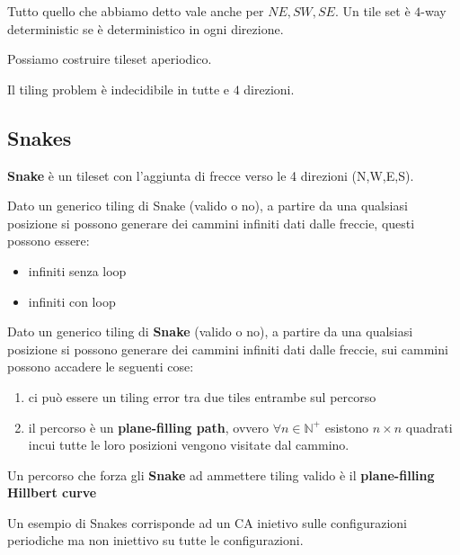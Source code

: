 Tutto quello che abbiamo detto vale anche per $NE, SW, SE$. Un tile set 
è $4$-way deterministic se è deterministico in ogni direzione.

\begin{nota}
    Possiamo costruire tileset aperiodico.
\end{nota}

\begin{teorema}
    Il tiling problem è indecidibile in tutte e $4$ direzioni.
\end{teorema}

\subsection{Snakes}

\begin{definizione} 
    \textbf{Snake} è un tileset con l'aggiunta di frecce verso le 4 direzioni (N,W,E,S).
\end{definizione}

Dato un generico tiling di Snake (valido o no), a partire da una qualsiasi posizione
si possono generare dei cammini infiniti dati dalle freccie, questi possono 
essere:
\begin{itemize}
    \item infiniti senza loop
    \item infiniti con loop
\end{itemize} 

Dato un generico tiling di \textbf{Snake} (valido o no), a partire da una qualsiasi posizione
si possono generare dei cammini infiniti dati dalle freccie, sui cammini possono
accadere le seguenti cose:
\begin{enumerate}
    \item ci può essere un tiling error tra due tiles entrambe sul percorso
    \item il percorso è un \textbf{plane-filling path}, ovvero $\forall n\in \mathbb{N}^+$
    esistono $n\times n$ quadrati incui tutte le loro posizioni vengono visitate 
    dal cammino.
\end{enumerate}

\begin{nota}
    Un percorso che forza gli \textbf{Snake} ad ammettere tiling valido è il \textbf{
        plane-filling Hillbert curve}
\end{nota}

\begin{esempio}
    Un esempio di Snakes corrisponde ad un CA inietivo sulle configurazioni periodiche
    ma non iniettivo su tutte le configurazioni.
\end{esempio}


